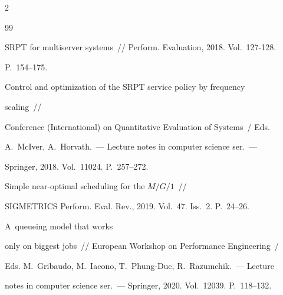 \begin{multicols}{2}
{{\begin{thebibliography}{99}




SRPT for multiserver systems~// Perform. Evaluation, 2018. Vol.~127-128. 


P.~154--175.









Control and optimization of the SRPT service policy by frequency 


scaling~// 


Conference (International) on Quantitative Evaluation of Systems~/ Eds. 


A.~McIver, A.~Horvath.~--- Lecture notes in computer science ser.~--- 


Springer, 2018. Vol.~11024. P.~257--272.









Simple near-optimal scheduling for the $M/G/1$~//


SIGMETRICS Perform. Eval. Rev., 2019. Vol.~47. Iss.~2. P.~24--26.










 A~queueing model that works


only on biggest jobs~// European Workshop on Performance Engineering~/ 


Eds. M.~Gribaudo, M.~Iacono, T.~Phung-Duc, R.~Razumchik.~--- Lecture 


notes in computer science ser.~--- Springer, 2020. Vol.~12039. P.~118--132.



















\end{thebibliography}}}
\end{multicols}
